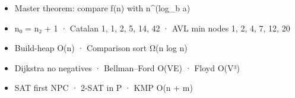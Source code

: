 \begin{revbox}

\begin{itemize}
\tightlist
\item
  Master theorem: compare f(n) with n\^{}(log\_b a)
\item
  n₀ = n₂ + 1 · Catalan 1, 1, 2, 5, 14, 42 · AVL min nodes 1, 2, 4, 7, 12, 20
\item
  Build-heap O(n) · Comparison sort Ω(n log n)
\item
  Dijkstra no negatives · Bellman--Ford O(VE) · Floyd O(V³)
\item
  SAT first NPC · 2-SAT in P · KMP O(n + m)
\end{itemize}

\end{revbox}

